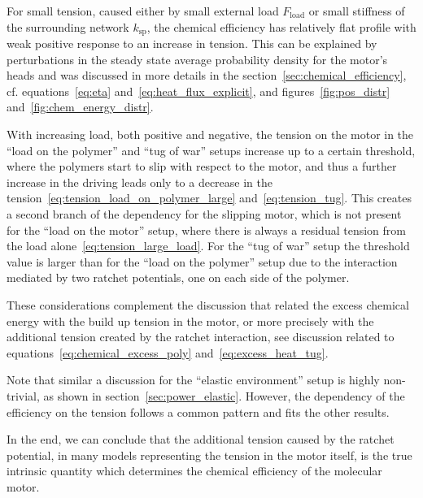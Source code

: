 \documentclass[aps,pre,twocolumn,showpacs,showkeys,superscriptaddress,floatfix]{revtex4-1}
\begin{document}
For small tension, caused either by small external load $F_\text{load}$ or small stiffness of the surrounding network $k_\text{sp}$, 
the chemical efficiency has relatively flat profile with weak positive response to an increase in tension.
This can be explained by perturbations in the steady state average probability density for the motor's heads 
and was discussed in more details in the section~\ref{sec:chemical_efficiency}, 
cf. equations~\eqref{eq:eta} and~\eqref{eq:heat_flux_explicit}, and figures~\ref{fig:pos_distr} and~\ref{fig:chem_energy_distr}.  

With increasing load, both positive and negative, the tension on the motor in the ``load on the polymer'' and ``tug of war'' setups increase up to a certain threshold,
where the polymers start to slip with respect to the motor, and thus a further increase in the driving leads only to a decrease in the tension~\eqref{eq:tension_load_on_polymer_large} and~\eqref{eq:tension_tug}.
This creates a second branch of the dependency for the slipping motor, 
which is not present for the ``load on the motor'' setup, where there is always a residual tension from the load alone~\eqref{eq:tension_large_load}.  
For the ``tug of war'' setup the threshold value is larger than for the ``load on the polymer'' setup due to the interaction mediated by two ratchet potentials, one on each side of the polymer. 

These considerations complement the discussion that related the excess chemical energy with the build up tension in the motor, or more precisely with the additional tension created by the ratchet interaction, see discussion related to equations~\eqref{eq:chemical_excess_poly} and~\eqref{eq:excess_heat_tug}. 

Note that similar a discussion for the ``elastic environment'' setup is highly non-trivial, as shown in section~\ref{sec:power_elastic}.
However, the dependency of the efficiency on the tension follows a common pattern and fits the other results. 

In the end, we can conclude that the additional tension caused by the ratchet potential, in many models representing the tension in the motor itself, is the true intrinsic quantity which determines the chemical efficiency of the molecular motor. 
\end{document}
